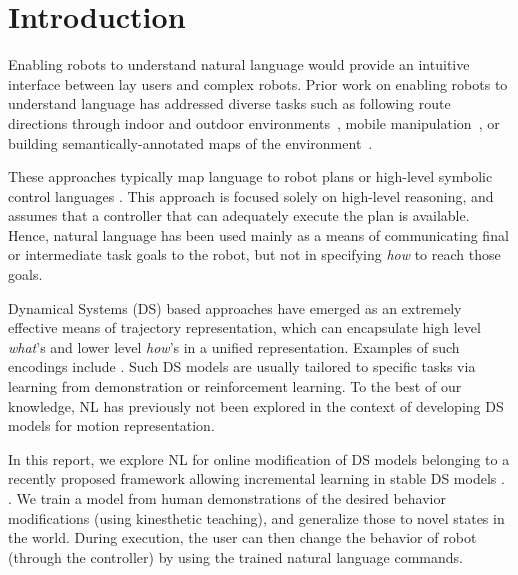 \section{Introduction}
\label{secIntroduction}


Enabling robots to understand natural language would provide an intuitive interface between lay users and complex robots.
Prior work on enabling robots to understand language has addressed diverse tasks such as following route directions through indoor and outdoor environments~\cite{macmahon06, kollar10, matuszek12a, duvallet13, boularias15}, mobile manipulation~\cite{tellex11, howard14a}, or building semantically-annotated maps of the environment~\cite{walter13}.

These approaches typically map language to robot plans or high-level symbolic control languages . This approach is focused solely on high-level reasoning, and assumes that a controller that can adequately execute the plan is available. Hence, natural language has been used mainly as a means of communicating final or intermediate task goals to the robot, but not in specifying \emph{how} to reach those goals.

Dynamical Systems (DS) based approaches have emerged as an extremely effective means of trajectory representation, which can encapsulate high level \emph{what}'s and lower level \emph{how}'s in a unified representation. Examples of such encodings include . Such DS models are usually tailored to specific tasks via learning from demonstration or reinforcement learning. To the best of our knowledge, NL has previously not been explored in the context of developing DS models for motion representation.

In this report, we explore NL for online modification of DS models belonging to a recently proposed framework allowing incremental learning in stable DS models . . We train a model from human demonstrations of the desired behavior modifications (using kinesthetic teaching), and generalize those to novel states in the world.
During execution, the user can then change the behavior of robot (through the controller) by using the trained natural language commands.



